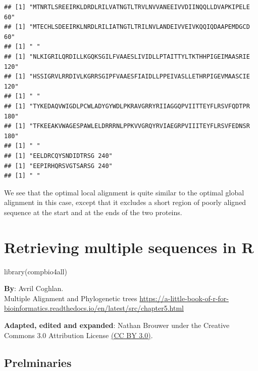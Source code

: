 \documentclass[
]{book}
\newenvironment{Shaded}{\begin{snugshade}}{\end{snugshade}}
\newcommand{\FunctionTok}[1]{\textcolor[rgb]{0.00,0.00,0.00}{#1}}
\newcommand{\NormalTok}[1]{#1}
\begin{document}
\begin{verbatim}
## [1] "MTNRTLSREEIRKLDRDLRILVATNGTLTRVLNVVANEEIVVDIINQQLLDVAPKIPELE 60"
## [1] "MTECHLSDEEIRKLNRDLRILIATNGTLTRILNVLANDEIVVEIVKQQIQDAAPEMDGCD 60"
## [1] " "
## [1] "NLKIGRILQRDILLKGQKSGILFVAAESLIVIDLLPTAITTYLTKTHHPIGEIMAASRIE 120"
## [1] "HSSIGRVLRRDIVLKGRRSGIPFVAAESFIAIDLLPPEIVASLLETHRPIGEVMAASCIE 120"
## [1] " "
## [1] "TYKEDAQVWIGDLPCWLADYGYWDLPKRAVGRRYRIIAGGQPVIITTEYFLRSVFQDTPR 180"
## [1] "TFKEEAKVWAGESPAWLELDRRRNLPPKVVGRQYRVIAEGRPVIIITEYFLRSVFEDNSR 180"
## [1] " "
## [1] "EELDRCQYSNDIDTRSG 240"
## [1] "EEPIRHQRSVGTSARSG 240"
## [1] " "
\end{verbatim}

We see that the optimal local alignment is quite similar to the optimal global alignment in this case, except that it excludes a short region of poorly aligned sequence at the start and at the ends of the two proteins.

\hypertarget{retrieving-multiple-sequences-in-r}{%
\chapter{Retrieving multiple sequences in R}\label{retrieving-multiple-sequences-in-r}}

\begin{Shaded}
\begin{Highlighting}[]
\FunctionTok{library}\NormalTok{(compbio4all)}
\end{Highlighting}
\end{Shaded}

\textbf{By}: Avril Coghlan.\\
Multiple Alignment and Phylogenetic trees
\url{https://a-little-book-of-r-for-bioinformatics.readthedocs.io/en/latest/src/chapter5.html}

\textbf{Adapted, edited and expanded}: Nathan Brouwer under the Creative Commons 3.0 Attribution License \href{https://creativecommons.org/licenses/by/3.0/}{(CC BY 3.0)}.

\hypertarget{prelminaries}{%
\section{Prelminaries}\label{prelminaries}}
\end{document}
